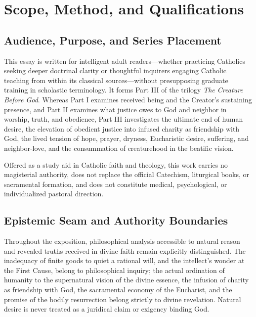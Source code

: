 \section{Scope, Method, and Qualifications}

\subsection*{Audience, Purpose, and Series Placement}

This essay is written for intelligent adult readers---whether practicing Catholics seeking deeper doctrinal clarity or thoughtful inquirers engaging Catholic teaching from within its classical sources---without presupposing graduate training in scholastic terminology. It forms Part III of the trilogy \emph{The Creature Before God}. Whereas Part I examines received being and the Creator's sustaining presence, and Part II examines what justice owes to God and neighbor in worship, truth, and obedience, Part III investigates the ultimate end of human desire, the elevation of obedient justice into infused charity as friendship with God, the lived tension of hope, prayer, dryness, Eucharistic desire, suffering, and neighbor-love, and the consummation of creaturehood in the beatific vision.

Offered as a study aid in Catholic faith and theology, this work carries no magisterial authority, does not replace the official Catechism, liturgical books, or sacramental formation, and does not constitute medical, psychological, or individualized pastoral direction.

\subsection*{Epistemic Seam and Authority Boundaries}

Throughout the exposition, philosophical analysis accessible to natural reason and revealed truths received in divine faith remain explicitly distinguished. The inadequacy of finite goods to quiet a rational will, and the intellect's wonder at the First Cause, belong to philosophical inquiry; the actual ordination of humanity to the supernatural vision of the divine essence, the infusion of charity as friendship with God, the sacramental economy of the Eucharist, and the promise of the bodily resurrection belong strictly to divine revelation. Natural desire is never treated as a juridical claim or exigency binding God.

